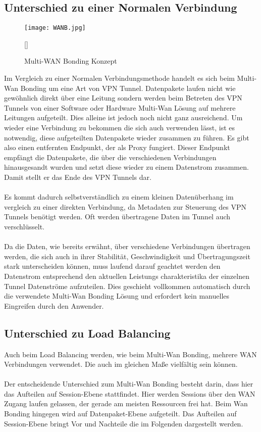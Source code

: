 \subsection{Unterschied zu einer Normalen Verbindung}
\begin{figure}[h]
    \centering
    \texttt{[image: WANB.jpg]}
    \caption[Multi-WAN Bonding Konzept]{Multi-WAN Bonding Konzept}[\cite{WANB}]
\end{figure}
\noindent
Im Vergleich zu einer Normalen Verbindungsmethode handelt es sich beim Multi-Wan Bonding um eine Art von VPN Tunnel. Datenpakete laufen nicht wie gewöhnlich direkt über eine Leitung sondern werden beim Betreten des VPN Tunnels von einer Software oder Hardware Multi-Wan Lösung auf mehrere Leitungen aufgeteilt. Dies alleine ist jedoch noch nicht ganz ausreichend. Um wieder eine Verbindung zu bekommen die sich auch verwenden lässt, ist es notwendig, diese aufgeteilten Datenpakete wieder zusammen zu führen. Es gibt also einen entfernten Endpunkt, der als Proxy fungiert. Dieser Endpunkt empfängt die Datenpakete, die über die verschiedenen Verbindungen hinausgesandt wurden und setzt diese wieder zu einem Datenstrom zusammen. Damit stellt er das Ende des VPN Tunnels dar. 
\\\\
Es kommt dadurch selbstverständlich zu einem kleinen Datenüberhang im vergleich zu einer direkten Verbindung, da Metadaten zur Steuerung des VPN Tunnels benötigt werden. Oft werden übertragene Daten im Tunnel auch verschlüsselt.
\\\\
Da die Daten, wie bereits erwähnt, über verschiedene Verbindungen übertragen werden, die sich auch in ihrer Stabilität, Geschwindigkeit und Übertragungszeit stark unterscheiden können, muss laufend darauf geachtet werden den Datenstrom entsprechend den aktuellen Leistungs charakteristika der einzelnen Tunnel Datenströme aufzuteilen. Dies geschieht vollkommen automatisch durch die verwendete Multi-Wan Bonding Lösung und erfordert kein manuelles Eingreifen durch den Anwender.

\subsection{Unterschied zu Load Balancing}
Auch beim Load Balancing werden, wie beim Multi-Wan Bonding, mehrere WAN Verbindungen verwendet. Die auch im gleichen Maße vielfältig sein können.
\\\\
Der entscheidende Unterschied zum Multi-Wan Bonding besteht darin, dass hier das Aufteilen auf Session-Ebene stattfindet. Hier werden Sessions über den WAN Zugang laufen gelassen, der gerade am meisten Ressourcen frei hat. Beim Wan Bonding hingegen wird auf Datenpaket-Ebene aufgeteilt. Das Aufteilen auf Session-Ebene bringt Vor und Nachteile die im Folgenden dargestellt werden.
\newpage
